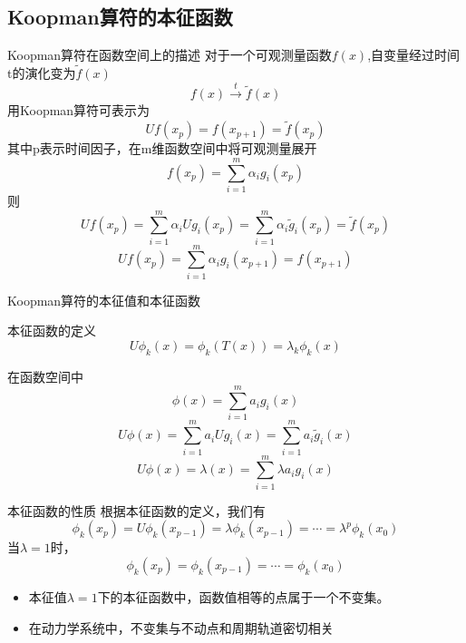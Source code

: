 \documentclass{beamer}
\begin{document}
	\subsection{Koopman算符的本征函数}
	\begin{frame}{Koopman算符在函数空间上的描述}
	对于一个可观测量函数$f(x)$,自变量经过时间t的演化变为$\tilde{f}(x)$
	$$f(x)\xrightarrow{t}\tilde{f}(x)$$
	用Koopman算符可表示为
	$$Uf(x_p)=f(x_{p+1})=\tilde{f}(x_p)$$
	其中p表示时间因子，在m维函数空间中将可观测量展开
	$$f(x_p)=\sum_{i=1}^{m}\alpha_ig_i(x_p)$$
	则
	$$Uf(x_p)=\sum_{i=1}^{m}\alpha_iUg_i(x_p)=\sum_{i=1}^{m}\alpha_i\tilde{g}_i(x_p)=\tilde{f}(x_p)$$
	$$Uf(x_p)=\sum_{i=1}^{m}\alpha_ig_i(x_{p+1})=f(x_{p+1})$$
	\end{frame}
	\begin{frame}{Koopman算符的本征值和本征函数}
	\begin{block}{本征函数的定义}
		$$U\phi _k(x)=\phi _k(T(x))=\lambda _k\phi _k(x)$$
	\end{block}
	在函数空间中
	$$\phi (x)=\sum_{i=1}^{m}a_ig_i(x)$$
	$$U\phi (x)=\sum_{i=1}^{m}a_iUg_i(x)=\sum_{i=1}^{m}a_i\tilde{g}_i(x)$$
	$$U\phi(x)=\lambda (x)=\sum_{i=1}^{m}\lambda a_ig_i(x)$$
	\end{frame}
	\begin{frame}{本征函数的性质}
		根据本征函数的定义，我们有
		$$\phi_k(x_p)=U\phi_k(x_{p-1})=\lambda \phi_k(x_{p-1})=\cdots=\lambda^p\phi_k(x_0)$$
		当$\lambda=1$时，$$\phi_k(x_p)=\phi_k(x_{p-1})=\cdots=\phi_k(x_0)$$
		\begin{itemize}
			\item 本征值$\lambda=1$下的本征函数中，函数值相等的点属于一个不变集。
			\item 在动力学系统中，不变集与不动点和周期轨道密切相关
		\end{itemize}
	\end{frame}
\end{document}
